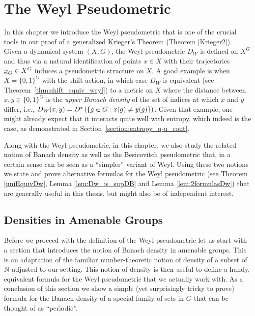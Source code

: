 \chapter{The Weyl Pseudometric}\label{chapter:Weyl}

In this chapter we introduce the Weyl pseudometric that is one of the crucial tools in our proof of a generalized Krieger's Theorem (Theorem \ref{Krieger2}).
%
Given a dynamical system $(X,G)$, the Weyl pseudometric $D_W$ is defined on $X^G$ and thus via a natural identification of points $x\in X$ with their trajcetories $\underline{x}_G\in X^G$ induces a pseudometric structure on $X$.
%
A good example is when $X=\{0,1\}^G$ with the shift action, in which case $D_W$ is equivalent (see Theorem~\ref{thm:shift_equiv_weyl}) to a metric on $X$ where the distance between $x,y\in \{0,1\}^G$ is the {\it upper Banach density} of the set of indices at which $x$ and $y$ differ, i.e., $D_W(x,y)=D^\star \left(\{g\in G: x(g)\neq y(g)\}\right)$.
%
Given that example, one might already expect that it interacts quite well with entropy, which indeed is the case, as demonstrated in Section~\ref{section:entropy_q-u_cont}.


Along with the Weyl pseudometric, in this chapter, we also study the related notion of Banach density as well as the Besicovitch pseudometric that, in a certain sense can be seen as a ``simpler'' variant of Weyl.
%
Using these two notions we state and prove alternative formulas for the Weyl pseudometric (see Theorem \ref{uniEquivDw}, Lemma \ref{lem:Dw_is_supDB} and Lemma \ref{lem:2formulasDw}) that are generally useful in this thesis, but might also be of independent interest.

\section{Densities in Amenable Groups}\label{section:density}
Before we proceed with the definition of the Weyl pseudometric let us start with a section that introduces the notion of Banach density in amenable groups.
%
This is an adaptation of the familiar number-theoretic notion of density of a subset of $\mathbb{N}$ adjusted to our setting.
%
This notion of density is then useful to define a handy, equivalent formula for the Weyl pseudometric that we actually work with.
%
As a conclusion of this section we show a simple (yet surprisingly tricky to prove) formula for the Banach density of a special family of sets in $G$ that can be thought of as ``periodic''.

